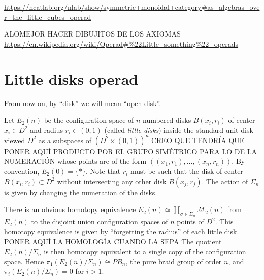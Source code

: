 \documentclass[TFM.tex]{subfiles}
\begin{document}
\url{https://ncatlab.org/nlab/show/symmetric+monoidal+category#as_algebras_over_the_little_cubes_operad}

ALOMEJOR HACER DIBUJITOS DE LOS AXIOMAS \url{https://en.wikipedia.org/wiki/Operad#\%22Little_something\%22_operads}


\section{Little disks operad}\label{little}

From now on, by ``disk'' we will mean ``open disk''. 
 
 Let $E_2(n)$ be the configuration space of $n$ numbered disks $B(x_i,r_i)$ of center $x_i\in D^2$ and radius $r_i\in (0,1)$ (called \emph{little disks}) inside the standard unit disk viewed $D^2$ as a subspaces of $(D^2\times (0,1))^n$ CREO QUE TENDRÍA QUE PONER AQUÍ PRODUCTO POR EL GRUPO SIMÉTRICO PARA LO DE LA NUMERACIÓN whose points are of the form $((x_1,r_1),\dots, (x_n,r_n))$. By convention, $E_2(0)=\{*\}$. Note that $r_i$ must be such that the disk of center $B(x_i,r_i)\subset D^2$ without intersecting any other disk $B(x_j,r_j)$. The action of $\Sigma_n$ is given by changing the numeration of the disks. 
 
 There is an obvious homotopy equivalence $E_2(n)\simeq \coprod_{\sigma\in\Sigma_n}\mathcal{M}_2(n)$ from $E_2(n)$ to the disjoint union configuration spaces of $n$ points of $D^2$. This homotopy equivalence is given by ``forgetting the radius'' of each little disk. PONER AQUÍ LA HOMOLOGÍA CUANDO LA SEPA%
  The quotient $E_2(n)/\Sigma_n$ is then homotopy equivalent to a single copy of the configuration space. Hence $\pi_1(E_2(n)/\Sigma_n)\cong PB_n$, the pure braid group of order $n$, and $\pi_i(E_2(n)/\Sigma_n)=0$ for $i>1$. 
 
 
\end{document}
